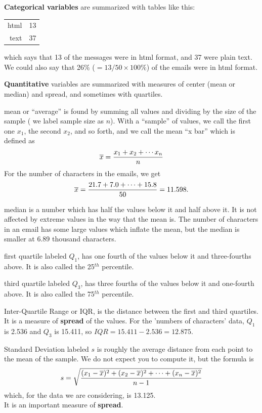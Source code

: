 \begin{list}{}{}
\item [\bf Categorical variables] are summarized with tables like
  this:

\begin{tabular}{rr}
  \hline
html &  13 \\ 
text &  37 \\ 
   \hline
\end{tabular}

 which says that 13 of the messages were in html format, and 37 were
 plain text.  We could also say that 26\% ($= 13 / 50 \times 100\%$)
 of the emails were in html format. 

\item [\bf Quantitative] variables are summarized with measures of
  center (mean or median) and spread, and sometimes with quartiles.
  \begin{list}{}{}
  \item [mean] or ``average'' is found by summing all values and
    dividing by the size of the sample ( we label sample size as $n$).
    With a ``sample'' of values, we call the first one $x_1$, the
    second $x_2$, and so forth, and we call the mean ``x bar'' which
    is defined as
   $$\overline{x} = \frac{x_1 + x_2 + \cdots x_n}{n}$$
  For the number of characters in the emails, we get 
   $$\overline{x} = \frac{21.7 + 7.0 + \cdots + 15.8}{50} = 11.598.$$
  \item [median] is a number which has half the values below it and
    half above it.  It is not affected by extreme values in the way
    that the mean is.  The number of characters in an email has some
    large values which inflate the mean, but the median is smaller at
    6.89 thousand characters.
  \item [first quartile] labeled $Q_1$, has one fourth of the values
    below it and three-fourths above. It is also called the 25$^{th}$
    percentile. 
  \item [third quartile] labeled $Q_3$, has three fourths of the values
    below it and one-fourth above.  It is also called the 75$^{th}$
    percentile. 
  \item [Inter-Quartile Range] or IQR, is the distance between the
    first and third quartiles.  It is a measure of {\bf spread} of the
    values.  For the 'numbers of characters' data, $Q_1$ is 2.536 and $Q_3$ is
    15.411, so $IQR = 15.411 - 2.536 = 12.875$.
  \item [Standard Deviation] labeled $s$ is roughly the average
    distance from each point to the mean of the sample.  We do not
    expect you to compute it, but the formula is
      $$ s = \sqrt{\frac{(x_1-\overline{x})^2 + (x_2-\overline{x})^2 + \cdots+ (x_n-\overline{x})^2}{n-1}}$$
    which, for the data we are considering, is 13.125.\\
    It is an important measure of {\bf spread}.
  \end{list}
\end{list}
\newpage

